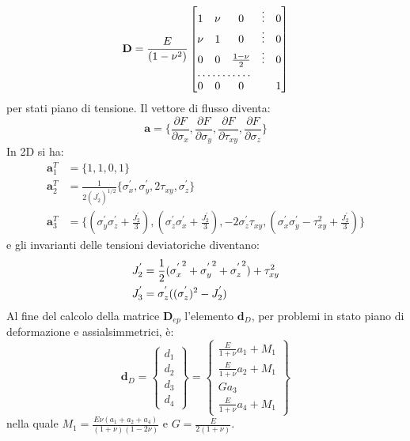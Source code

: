 \begin{equation}
	\mathbf{D} = \frac{E}{(1-\nu^2)}
	\begin{bmatrix}
		1	&	\nu	&	0					&	\vdots		&	0	\\
		\nu	&	1	&	0					&	\vdots		&	0	\\
		0	&	0	&	\frac{1 - \nu}{2}	&	\vdots		&	0	\\
		\hdotsfor{3} 												\\
		0	&	0	&	0					&				&	1		
	\end{bmatrix}
\end{equation}
per stati piano di tensione. Il vettore di flusso diventa:
\begin{equation}
	\mathbf{a} = \{ \frac{\partial F}{\partial \sigma_x},  \frac{\partial F}{\partial \sigma_y}, \frac{\partial F}{\partial \tau_{xy}}, \frac{\partial F}{\partial \sigma_z} \}
\end{equation}
In 2D si ha:
\begin{equation}
	\begin{split}
		\mathbf{a}_1^T & = \{ 1, 1, 0, 1 \}	\\
		\mathbf{a}_2^T & = \frac{1}{2(J_2^{'})^{1/2}}\{\sigma_x^{'},  \sigma_y^{'}, 2\tau_{xy}, \sigma_z^{'}\}			\\
		\mathbf{a}_3^T & = \{ (\sigma_y^{'} \sigma_z^{'} + \frac{J_2^{'}}{3}), (\sigma_z^{'} \sigma_x^{'} + \frac{J_2^{'}}{3}), -2 \sigma_z^{'} \tau_{xy}, (\sigma_x^{'} \sigma_y^{'} - \tau_{xy}^2 + \frac{J_2^{'}}{3}) \}
	\end{split}
\end{equation}
e gli invarianti delle tensioni deviatoriche diventano:
\begin{align}
	J_2^{'} & =	\frac{1}{2}( {\sigma_x^{'}}^2 + {\sigma_y^{'}}^2 + {\sigma_z^{'}}^2) + \tau_{xy}^2	\notag \\
	J_3^{'} & = \sigma_z^{'} ((\sigma_z^{'})^2  - J_2^{'})    
\end{align}
Al fine del calcolo della matrice $\mathbf{D}_{ep}$ l'elemento $\mathbf{d}_D$, per problemi in stato piano di deformazione e assialsimmetrici, è:
\[
\mathbf{d}_D =
\begin{Bmatrix}
	d_1 \\
	d_2 \\
	d_3 \\
	d_4
\end{Bmatrix}
=
\begin{Bmatrix}
	\frac{E}{1 + \nu}a_1 + M_1 \\
	\frac{E}{1 + \nu}a_2 + M_1 \\
	Ga_3 \\
	\frac{E}{1 + \nu}a_4 + M_1
\end{Bmatrix}
\]
nella quale $M_1 = \frac{E\nu(a_1+a_2+a_4)}{(1+\nu)(1-2\nu)}$ e $G=\frac{E}{2(1+\nu)}$.

